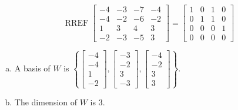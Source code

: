 \begin{exerciseAnswer} 


\[\operatorname{RREF} \left[\begin{array}{cccc}
-4 & -3 & -7 & -4 \\
-4 & -2 & -6 & -2 \\
1 & 3 & 4 & 3 \\
-2 & -3 & -5 & 3
\end{array}\right] = \left[\begin{array}{cccc}
1 & 0 & 1 & 0 \\
0 & 1 & 1 & 0 \\
0 & 0 & 0 & 1 \\
0 & 0 & 0 & 0
\end{array}\right] \]


\begin{enumerate}[(a)]
\item A basis of \(W\) is \( \left\{ \left[\begin{array}{c}
-4 \\
-4 \\
1 \\
-2
\end{array}\right] , \left[\begin{array}{c}
-3 \\
-2 \\
3 \\
-3
\end{array}\right] , \left[\begin{array}{c}
-4 \\
-2 \\
3 \\
3
\end{array}\right] \right\} \).
\item The dimension of \(W\) is \( 3 \).
\end{enumerate}
    
\end{exerciseAnswer}
    
